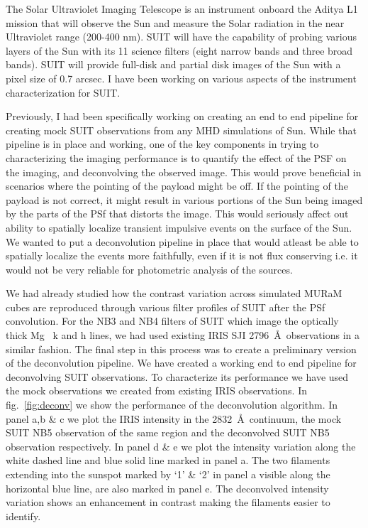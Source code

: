 \documentclass[a4paper,11pt]{article}
\begin{document}
The Solar Ultraviolet Imaging Telescope \citep[SUIT;][]{suit} is an instrument onboard the Aditya L1 mission that will observe the Sun and measure the Solar radiation in the near Ultraviolet range (200-400 nm). SUIT will have the capability of probing various layers of the Sun with its 11 science filters (eight narrow bands and three broad bands). SUIT will provide full-disk and partial disk images of the Sun with a pixel size of 0.7 arcsec. I have been working on various aspects of the instrument characterization for SUIT.

Previously, I had been specifically working on creating an end to end pipeline for creating mock SUIT observations from any MHD simulations of Sun. While that pipeline is in place and working, one of the key components in trying to characterizing the imaging performance is to quantify the effect of the PSF on the imaging, and deconvolving the observed image. This would prove beneficial in scenarios where the pointing of the payload might be off. If the pointing of the payload is not correct, it might result in various portions of the Sun being imaged by the parts of the PSf that distorts the image. This would seriously affect out ability to spatially localize transient impulsive events on the surface of the Sun. We wanted to put a deconvolution pipeline in place that would atleast be able to spatially localize the events more faithfully, even if it is not flux conserving i.e. it would not be very reliable for photometric analysis of the sources. 

We had already studied how the contrast variation across simulated MURaM cubes are reproduced through various filter profiles of SUIT after the PSf convolution. For the NB3 and NB4 filters of SUIT which image the optically thick Mg~ k and h lines, we had used existing IRIS SJI 2796~\AA~observations in a similar fashion. The final step in this process was to create a preliminary version of the deconvolution pipeline. We have created a working end to end pipeline for deconvolving SUIT observations. To characterize its performance we have used the mock observations we created from existing IRIS observations. In fig.~\ref{fig:deconv} we show the performance of the deconvolution algorithm. In panel a,b \& c we plot the IRIS intensity in the 2832~\AA~continuum, the mock SUIT NB5 observation of the same region and the deconvolved SUIT NB5 observation respectively. In panel d \& e we plot the intensity variation along the white dashed line and blue solid line marked in panel a. The two filaments extending into the sunspot marked by `1' \& `2' in panel a visible along the horizontal blue line, are also marked in panel e. The deconvolved intensity variation shows an enhancement in contrast making the filaments easier to identify. 
\end{document}
